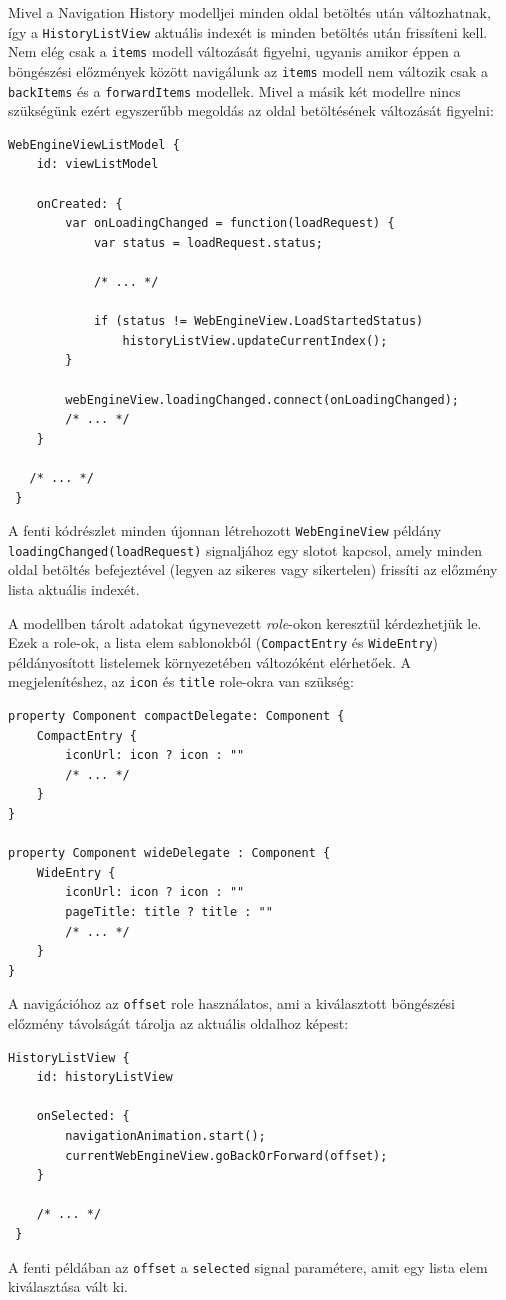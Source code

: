 \documentclass[12pt]{report}
\begin{document}
Mivel a Navigation History modelljei minden oldal betöltés után változhatnak, így a
\texttt{HistoryListView} aktuális indexét is minden betöltés után frissíteni kell. Nem elég
csak a \texttt{items} modell változását figyelni, ugyanis amikor éppen a böngészési előzmények
között navigálunk az \texttt{items} modell nem változik csak a \texttt{backItems} és a
\texttt{forwardItems} modellek. Mivel a másik két modellre nincs szükségünk ezért egyszerűbb
megoldás az oldal betöltésének változását figyelni:
\newpage
\begin{lstlisting}[title=main.qml]
 WebEngineViewListModel {
    id: viewListModel

    onCreated: {
        var onLoadingChanged = function(loadRequest) {
            var status = loadRequest.status;

            /* ... */

            if (status != WebEngineView.LoadStartedStatus)
                historyListView.updateCurrentIndex();
        }

        webEngineView.loadingChanged.connect(onLoadingChanged);
        /* ... */
    }

   /* ... */
 }
\end{lstlisting}
A fenti kódrészlet minden újonnan létrehozott \texttt{WebEngineView} példány
\texttt{loadingChanged(loadRequest)} signaljához egy slotot kapcsol, amely minden oldal
betöltés befejeztével (legyen az sikeres vagy sikertelen) frissíti az előzmény lista
aktuális indexét.

A modellben tárolt adatokat úgynevezett \textit{role}-okon keresztül kérdezhetjük le.
Ezek a role-ok, a lista elem sablonokból (\texttt{CompactEntry} és \texttt{WideEntry})
példányosított listelemek környezetében változóként elérhetőek. A megjelenítéshez, az
\texttt{icon} és \texttt{title} role-okra van szükség:
\begin{lstlisting}[title=views/HistoryListView.qml]
property Component compactDelegate: Component {
    CompactEntry {
        iconUrl: icon ? icon : ""
        /* ... */
    }
}

property Component wideDelegate : Component {
    WideEntry {
        iconUrl: icon ? icon : ""
        pageTitle: title ? title : ""
        /* ... */
    }
}
\end{lstlisting}
A navigációhoz az \texttt{offset} role használatos, ami a kiválasztott böngészési előzmény
távolságát tárolja az aktuális oldalhoz képest:
\begin{lstlisting}[title=main.qml]
 HistoryListView {
    id: historyListView

    onSelected: {
        navigationAnimation.start();
        currentWebEngineView.goBackOrForward(offset);
    }

    /* ... */
 }
\end{lstlisting}
A fenti példában az \texttt{offset} a \texttt{selected} signal paramétere, amit egy lista elem
kiválasztása vált ki.
\end{document}
